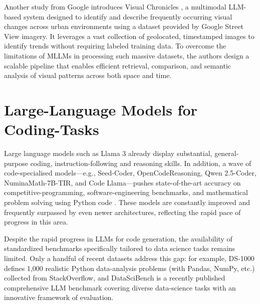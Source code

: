 Another study from Google introduces Visual Chronicles \cite{Deng2025VisualChronicles}, a multimodal LLM-based system designed to identify and describe frequently occurring visual changes across urban environments using a dataset provided by Google Street View imagery. It leverages a vast collection of geolocated, timestamped images to identify trends without requiring labeled training data. To overcome the limitations of MLLMs in processing such massive datasets, the authors design a scalable pipeline that enables efficient retrieval, comparison, and semantic analysis of visual patterns across both space and time.




\section{Large-Language Models for Coding-Tasks}

Large language models such as Llama 3 \cite{Grattafiori2024Llama3} already display substantial, general-purpose coding, instruction-following and reasoning skills. In addition, a wave of code-specialised models—e.g., Seed-Coder, OpenCodeReasoning, Qwen 2.5-Coder, NuminaMath-7B-TIR, and Code Llama—pushes state-of-the-art accuracy on competitive-programming, software-engineering benchmarks, and mathematical problem solving using Python code \cite{Seed2025SeedCoder, Ahmad2025OCRNVidia, Hui2024Qwen25Coder, Roziere2024CodeLlama, Moshkov2025AIMO2, Yin2024MuMathCode, Gou2024ToRA}. These models are constantly improved and frequently surpassed by even newer architectures, reflecting the rapid pace of progress in this area.

Despite the rapid progress in LLMs for code generation, the availability of standardized benchmarks specifically tailored to data science tasks remains limited. Only a handful of recent datasets address this gap: for example, DS‑1000 \cite{Lai2022DS1000} defines 1,000 realistic Python data-analysis problems (with Pandas, NumPy, etc.) collected from StackOverflow, and DataSciBench \cite{Zhang2025DataSciBench} is a recently published comprehensive LLM benchmark covering diverse data-science tasks with an innovative framework of evaluation.

